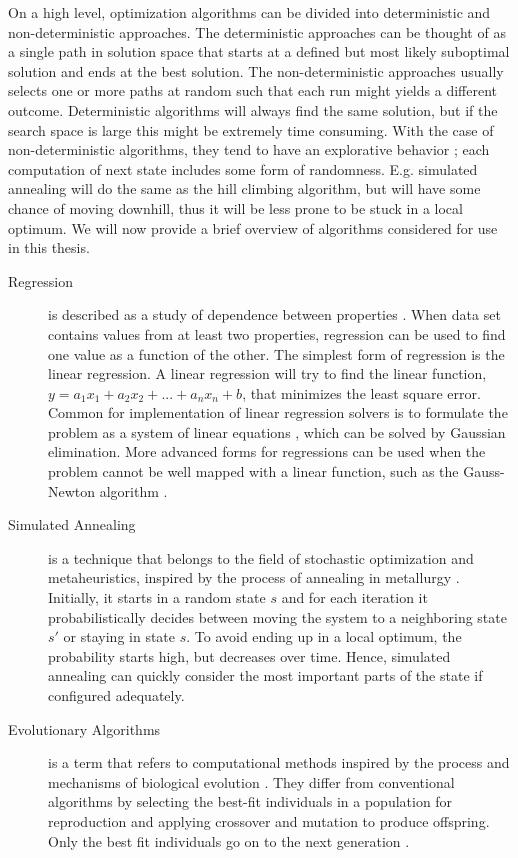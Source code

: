 On a high level, optimization algorithms can be divided into deterministic and
non-deterministic approaches. The deterministic approaches can be thought of as
a single path in solution space that starts at a defined but most likely
suboptimal solution and ends at the best solution. The non-deterministic
approaches usually selects one or more paths at random such that each run might
yields a different outcome. Deterministic algorithms will always find the same
solution, but if the search space is large this might be extremely time
consuming. With the case of non-deterministic algorithms, they tend to have
an explorative behavior \cite{poli2008field}; each computation of next state
includes some form of randomness. E.g. simulated annealing will do the same as
the hill climbing algorithm, but will have some chance of moving downhill, thus
it will be less prone to be stuck in a local optimum. We will now provide a brief
overview of algorithms considered for use in this thesis.


\begin{description}
    \item[Regression] is described as a study of dependence between properties
        \cite{weisberg2005applied}. When data set contains values from at
        least two properties, regression can be used to find one value as a
        function of the other. The simplest form of regression is the linear
        regression. A linear regression will try to find the linear function,
        $y=a_1x_1+a_2x_2+...+a_nx_n+b$, that minimizes the least square error.
        Common for implementation of linear regression solvers is to formulate
        the problem as a system of linear equations \cite{lay2011linear}, which
        can be solved by Gaussian elimination. More advanced forms for
        regressions can be used when the problem cannot be well mapped with a
        linear function, such as the Gauss-Newton algorithm
        \cite{myers1990classical}.

    \item[Simulated Annealing] is a technique that belongs to the field of
        stochastic optimization and metaheuristics, inspired by the process of
        annealing in metallurgy \cite{van1987simulated}. Initially, it starts in
        a random state $s$ and for each iteration it probabilistically decides
        between moving the system to a neighboring state $s'$ or staying in
        state $s$. To avoid ending up in a local optimum, the probability starts
        high, but decreases over time. Hence, simulated annealing can quickly
        consider the most important parts of the state if configured adequately.

    \item[Evolutionary Algorithms] is a term that refers to computational
        methods inspired by the process and mechanisms of biological evolution
        \cite{fogel1997evolutionary}.  They differ from conventional algorithms
        by selecting the best-fit individuals in a population for reproduction
        and applying crossover and mutation to produce offspring. Only the best
        fit individuals go on to the next generation \cite{introtoga}.

\end{description}

